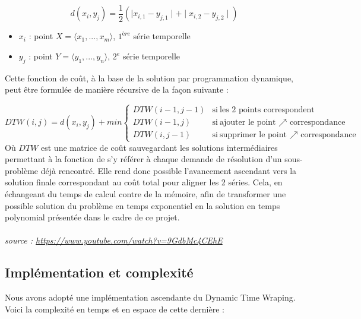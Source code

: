 \documentclass[a4paper, 11pt]{article}
\begin{document}
\[ d(x_i , y_j) = \frac{1}{2} \left( \mid x_{i,1} - y_{j,1} \mid +  \mid x_{i,2} - y_{j,2} \mid \right) \]

\begin{itemize}
    \item
    \mbox{\boldmath$x_i$} : point \in $X = \langle x_1, ..., x_m \rangle$, $1^{ère}$ série temporelle
    
    \item
    \mbox{\boldmath$y_j$} : point \in $Y = \langle y_1, ..., y_n \rangle$, $2^{e}$ série temporelle 
\end{itemize}

Cette fonction de coût, à la base de la solution par programmation dynamique, peut être formulée de manière récursive de la façon suivante :

\begin{equation*}
    DTW(i, j) = d(x_{i} , y_{j}) + min
        \begin{cases}
          DTW(i-1, j-1) & \text{si}\ \text{les 2 points correspondent} \\
          
          DTW(i-1, j) & \text{si}\  \text{ajouter le point $\nearrow$ correspondance}\\
          
          DTW(i, j-1) & \text{si}\ \text{supprimer le point $\nearrow$ correspondance}
        \end{cases}
\end{equation*}
Où $DTW$ est une matrice de coût sauvegardant les solutions intermédiaires permettant à la fonction de s'y référer à chaque demande de résolution d'un sous-problème déjà rencontré. Elle rend donc possible l'avancement ascendant vers la solution finale correspondant au coût total pour aligner les 2 séries. Cela, en échangeant du temps de calcul contre de la mémoire, afin de transformer une possible solution du problème en temps exponentiel en la solution en temps polynomial présentée dans le cadre de ce projet.
\\
\\
\textit{source : \url{https://www.youtube.com/watch?v=9GdbMc4CEhE}}

\subsection{Implémentation et complexité}
Nous avons adopté une implémentation ascendante du Dynamic Time Wraping. Voici la complexité en temps et en espace de cette dernière :
\end{document}
